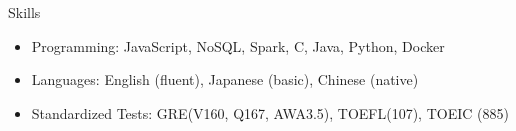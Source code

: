 \documentclass{cv}
\begin{document}


\begin{cvSection}{Skills}

\begin{itemize}[label=$\cdot$,leftmargin=0em]

\item Programming: JavaScript, NoSQL, Spark, C, Java, Python, Docker
\item Languages: English (fluent), Japanese (basic), Chinese (native)
\item Standardized Tests: GRE(V160, Q167, AWA3.5), TOEFL(107), TOEIC (885)

\end{itemize}

\end{cvSection}
\end{document}
